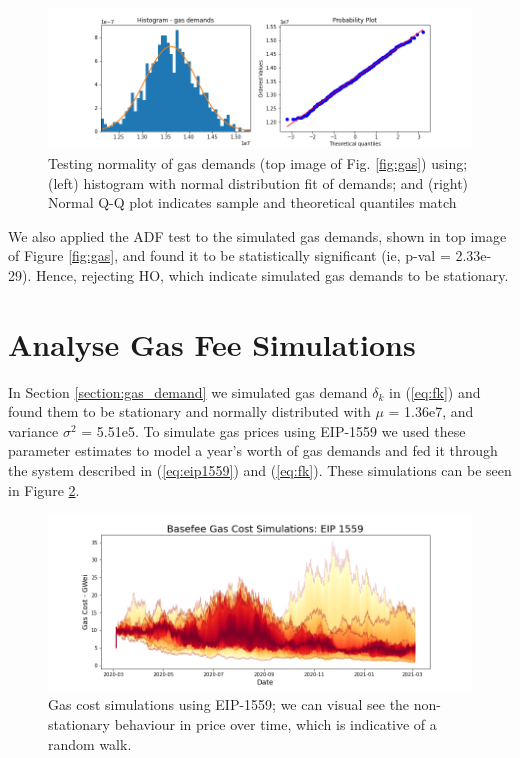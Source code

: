 \documentclass{article}
\begin{document}
\begin{figure}
\centering
\includegraphics[width=5in]{gaussian_analysis.png}
\caption{Testing normality of gas demands (top image of Fig. \ref{fig:gas}) using; (left) histogram with normal distribution fit of demands; and (right) Normal Q-Q plot indicates sample and theoretical quantiles match} 
\label{fig:eda}
\end{figure} 

We also applied the ADF test to the simulated gas demands, shown in top image of Figure \ref{fig:gas}, and found it to be statistically significant (ie, p-val = 2.33e-29). Hence, rejecting HO, which indicate simulated gas demands to be stationary. 


\section{Analyse Gas Fee Simulations}
\label{section:gas_fees}

In Section \ref{section:gas_demand} we simulated gas demand  $\delta_{k}$ in (\ref{eq:fk}) and found them to be stationary and normally distributed with $\mu$ = 1.36e7, and variance $\sigma^2$ = 5.51e5. To simulate gas prices using EIP-1559 we used these parameter estimates to model a year's worth of gas demands and fed it through the system described in (\ref{eq:eip1559}) and (\ref{eq:fk}). These simulations can be seen in Figure \ref{fig:basefee_simulations}.

\begin{figure}
\centering
\includegraphics[width=12 cm]{basefee_simulations.png}
\caption{Gas cost simulations using EIP-1559; we can visual see the non-stationary behaviour in price over time, which is indicative of a random walk.}  
\label{fig:basefee_simulations}
\end{figure} 
\end{document}
